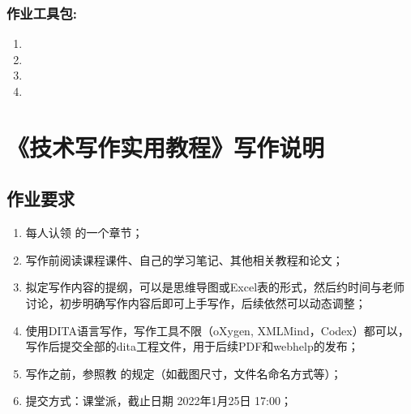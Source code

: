 \documentclass[letterpaper,10pt,english]{sphinxmanual}
\begin{document}
\subsection{作业工具包:}
\label{\detokenize{capstone-project/endnote-doc-usability:id7}}\begin{enumerate}
%
\item {} 
\sphinxAtStartPar
{}

\item {} 
\sphinxAtStartPar
{}

\item {} 
\sphinxAtStartPar
{}

\item {} 
\sphinxAtStartPar
{}

\end{enumerate}

\sphinxstepscope


\chapter{《技术写作实用教程》写作说明}
\label{\detokenize{capstone-project/book-authoring:id1}}\label{\detokenize{capstone-project/book-authoring::doc}}

\section{作业要求}
\label{\detokenize{capstone-project/book-authoring:id2}}\begin{enumerate}
%
\item {} 
\sphinxAtStartPar
每人认领  的一个章节；

\item {} 
\sphinxAtStartPar
写作前阅读课程课件、自己的学习笔记、其他相关教程和论文；

\item {} 
\sphinxAtStartPar
拟定写作内容的提纲，可以是思维导图或Excel表的形式，然后约时间与老师讨论，初步明确写作内容后即可上手写作，后续依然可以动态调整；

\item {} 
\sphinxAtStartPar
使用DITA语言写作，写作工具不限（oXygen, XMLMind，Codex）都可以，写作后提交全部的dita工程文件，用于后续PDF和webhelp的发布；

\item {} 
\sphinxAtStartPar
写作之前，参照教  的规定（如截图尺寸，文件名命名方式等）；

\item {} 
\sphinxAtStartPar
提交方式：课堂派，截止日期 2022年1月25日 17:00；

\end{enumerate}
\end{document}

